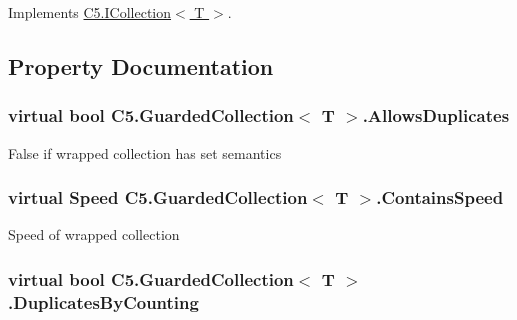 Implements \hyperlink{interface_c5_1_1_i_collection_a73a5d984e95e200de80261361bb7e57d}{C5.\+I\+Collection$<$ T $>$}.



\subsection{Property Documentation}
\hypertarget{class_c5_1_1_guarded_collection_ac879f9062572ce67048d438409b1f8a9}{}
\subsubsection[{Allows\+Duplicates}]{\setlength{\rightskip}{0pt plus 5cm}virtual bool {\bf C5.\+Guarded\+Collection}$<$ T $>$.Allows\+Duplicates\hspace{0.3cm}{\ttfamily [get]}}\label{class_c5_1_1_guarded_collection_ac879f9062572ce67048d438409b1f8a9}




False if wrapped collection has set semantics\hypertarget{class_c5_1_1_guarded_collection_a4c6ae95c3e5066e8f657546606deefaf}{}
\subsubsection[{Contains\+Speed}]{\setlength{\rightskip}{0pt plus 5cm}virtual {\bf Speed} {\bf C5.\+Guarded\+Collection}$<$ T $>$.Contains\+Speed\hspace{0.3cm}{\ttfamily [get]}}\label{class_c5_1_1_guarded_collection_a4c6ae95c3e5066e8f657546606deefaf}




Speed of wrapped collection\hypertarget{class_c5_1_1_guarded_collection_a02b79c68161065d8e2c6ddc89f004aea}{}
\subsubsection[{Duplicates\+By\+Counting}]{\setlength{\rightskip}{0pt plus 5cm}virtual bool {\bf C5.\+Guarded\+Collection}$<$ T $>$.Duplicates\+By\+Counting\hspace{0.3cm}{\ttfamily [get]}}\label{class_c5_1_1_guarded_collection_a02b79c68161065d8e2c6ddc89f004aea}


